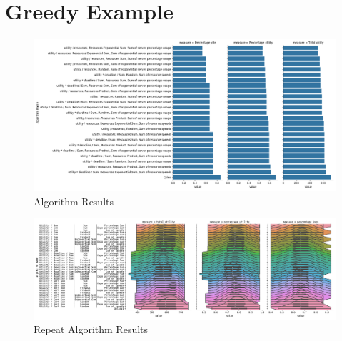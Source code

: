 \documentclass[fleqn]{article}
\begin{document}
\section{Greedy Example}\label{sec:greedy-example}
\begin{figure}[H]
    \centering
    \includegraphics[width=1\linewidth]{../results/greedy_algorithms.png}
    \caption{Algorithm Results}
\end{figure}

\begin{figure}[H]
    \centering
    \includegraphics[width=1\linewidth]{../results/repeat_greedy_algorithms.png}
    \caption{Repeat Algorithm Results}
\end{figure}
\end{document}
